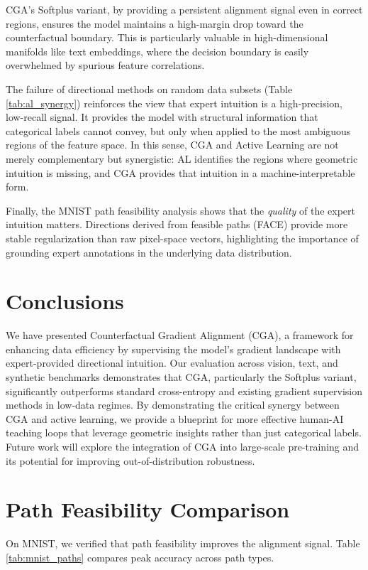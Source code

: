\documentclass[sigconf,anonymous]{aamas}
\begin{document}
CGA's Softplus variant, by providing a persistent alignment signal even in correct regions, ensures the model maintains a high-margin drop toward the counterfactual boundary. This is particularly valuable in high-dimensional manifolds like text embeddings, where the decision boundary is easily overwhelmed by spurious feature correlations. 

The failure of directional methods on random data subsets (Table \ref{tab:al_synergy}) reinforces the view that expert intuition is a high-precision, low-recall signal. It provides the model with structural information that categorical labels cannot convey, but only when applied to the most ambiguous regions of the feature space. In this sense, CGA and Active Learning are not merely complementary but synergistic: AL identifies the regions where geometric intuition is missing, and CGA provides that intuition in a machine-interpretable form.

Finally, the MNIST path feasibility analysis shows that the \emph{quality} of the expert intuition matters. Directions derived from feasible paths (FACE) provide more stable regularization than raw pixel-space vectors, highlighting the importance of grounding expert annotations in the underlying data distribution.

\section{Conclusions}
\label{sec:conclusions}
We have presented Counterfactual Gradient Alignment (CGA), a framework for enhancing data efficiency by supervising the model's gradient landscape with expert-provided directional intuition. Our evaluation across vision, text, and synthetic benchmarks demonstrates that CGA, particularly the Softplus variant, significantly outperforms standard cross-entropy and existing gradient supervision methods in low-data regimes. By demonstrating the critical synergy between CGA and active learning, we provide a blueprint for more effective human-AI teaching loops that leverage geometric insights rather than just categorical labels. Future work will explore the integration of CGA into large-scale pre-training and its potential for improving out-of-distribution robustness.

\balance



\appendix
\section{Path Feasibility Comparison}
On MNIST, we verified that path feasibility improves the alignment signal. Table \ref{tab:mnist_paths} compares peak accuracy across path types.
\end{document}
